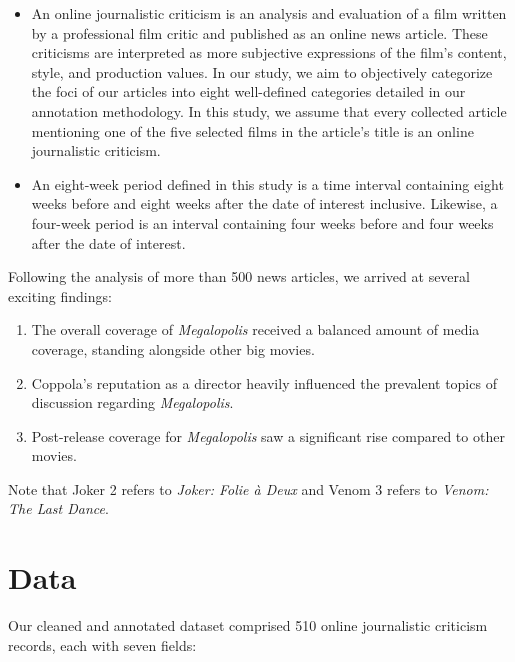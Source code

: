\documentclass[letterpaper]{article} %
\begin{document}
\begin{itemize}
    \item An online journalistic criticism is an analysis and evaluation of a film written by a professional film critic and published as an online news article. These criticisms are interpreted as more subjective expressions of the film's content, style, and production values. In our study, we aim to objectively categorize the foci of our articles into eight well-defined categories detailed in our annotation methodology. In this study, we assume that every collected article mentioning one of the five selected films in the article's title is an online journalistic criticism.
    
    \item An eight-week period defined in this study is a time interval containing eight weeks before and eight weeks after the date of interest inclusive. Likewise, a four-week period is an interval containing four weeks before and four weeks after the date of interest.

\end{itemize}
Following the analysis of more than 500 news articles, we arrived at several exciting findings:
\begin{enumerate}
    \item The overall coverage of \textit{Megalopolis} received a balanced amount of media coverage, standing alongside other big movies.
    
    \item Coppola's reputation as a director heavily influenced the prevalent topics of discussion regarding \textit{Megalopolis}.
    
    \item Post-release coverage for \textit{Megalopolis} saw a significant rise compared to other movies.

\end{enumerate}

Note that Joker 2 refers to \textit{Joker: Folie à Deux} and Venom 3 refers to \textit{Venom: The Last Dance}. 

\section{Data}

Our cleaned and annotated dataset comprised 510 online journalistic criticism records, each with seven fields:
\end{document}
